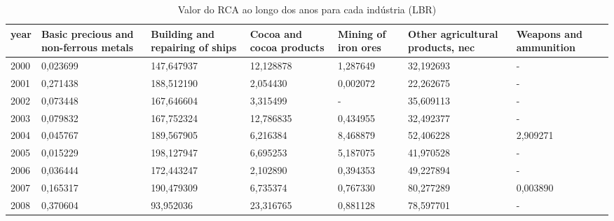 \begin{table}
\centering
\caption{Valor do RCA ao longo dos anos para cada indústria (LBR)}
\begin{tabular}{p{1cm}p{2cm}p{2cm}p{2cm}p{2cm}p{2cm}p{2cm}}
\toprule
 year &  Basic precious and non-ferrous metals &  Building and repairing of ships &  Cocoa and cocoa products &  Mining of iron ores &  Other agricultural products, nec &  Weapons and ammunition \\
\midrule
 2000 &                               0,023699 &                       147,647937 &                 12,128878 &             1,287649 &                         32,192693 &                       - \\
 2001 &                               0,271438 &                       188,512190 &                  2,054430 &             0,002072 &                         22,262675 &                       - \\
 2002 &                               0,073448 &                       167,646604 &                  3,315499 &                    - &                         35,609113 &                       - \\
 2003 &                               0,079832 &                       167,752324 &                 12,786835 &             0,434955 &                         32,492377 &                       - \\
 2004 &                               0,045767 &                       189,567905 &                  6,216384 &             8,468879 &                         52,406228 &                2,909271 \\
 2005 &                               0,015229 &                       198,127947 &                  6,695253 &             5,187075 &                         41,970528 &                       - \\
 2006 &                               0,036444 &                       172,443247 &                  2,102890 &             0,394353 &                         49,227894 &                       - \\
 2007 &                               0,165317 &                       190,479309 &                  6,735374 &             0,767330 &                         80,277289 &                0,003890 \\
 2008 &                               0,370604 &                        93,952036 &                 23,316765 &             0,881128 &                         78,597701 &                       - \\

\end{tabular}
\end{table}
